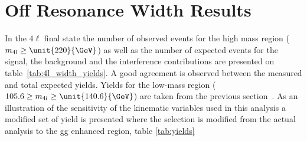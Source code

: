 \section{Off Resonance Width Results}
\label{sec:Width_Results}

In the $4\ell$ final state the number of observed events for the high mass region ($m_{4l} \ge \unit{220}{\GeV}$) as well as the number of expected events for the signal, the background and the interference contributions are presented on table~\ref{tab:4l_width_yields}. A good agreement is observed between the measured and total expected yields. Yields for the low-mass region ($105.6 \ge m_{4l} \ge \unit{140.6}{\GeV}$) are taken from the previous section~\cite{Chatrchyan:2013mxa}. As an illustration of the sensitivity of the kinematic variables used in this analysis a modified set of yield is presented where the selection is modified from the actual analysis to the gg enhanced region, table \ref{tab:yields}

